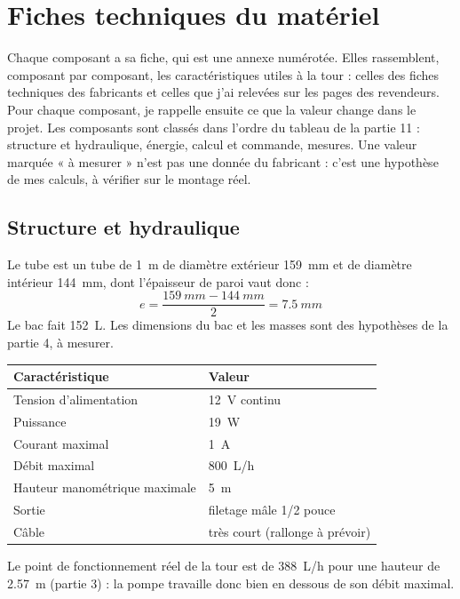 \clearpage
\section*{Fiches techniques du matériel}

Chaque composant a sa fiche, qui est une annexe numérotée. Elles rassemblent, composant par composant, les caractéristiques utiles à la tour : celles des fiches techniques des fabricants et celles que j'ai relevées sur les pages des revendeurs. Pour chaque composant, je rappelle ensuite ce que la valeur change dans le projet. Les composants sont classés dans l'ordre du tableau de la partie 11 : structure et hydraulique, énergie, calcul et commande, mesures. Une valeur marquée « à mesurer » n'est pas une donnée du fabricant : c'est une hypothèse de mes calculs, à vérifier sur le montage réel.

\subsection*{Structure et hydraulique}

\noindent Le tube est un tube de \qty{1}{m} de diamètre extérieur \qty{159}{mm} et de diamètre intérieur \qty{144}{mm}, dont l'épaisseur de paroi vaut donc :
\[
e = \frac{\qty{159}{mm} - \qty{144}{mm}}{2} = \qty{7,5}{mm}
\]
Le bac fait \qty{152}{L}. Les dimensions du bac et les masses sont des hypothèses de la partie 4, à mesurer.

\noindent
\begin{table}[H]
\centering
\begin{tabularx}{\linewidth}{lY}
\hline
Caractéristique & Valeur \\
\hline
Tension d'alimentation & \qty{12}{V} continu \\
Puissance & \qty{19}{W} \\
Courant maximal & \qty{1}{A} \\
Débit maximal & \qty{800}{L/h} \\
Hauteur manométrique maximale & \qty{5}{m} \\
Sortie & filetage mâle 1/2 pouce \\
Câble & très court (rallonge à prévoir) \\
\hline
\end{tabularx}
\end{table}
Le point de fonctionnement réel de la tour est de \qty{388}{L/h} pour une hauteur de \qty{2,57}{m} (partie 3) : la pompe travaille donc bien en dessous de son débit maximal.


